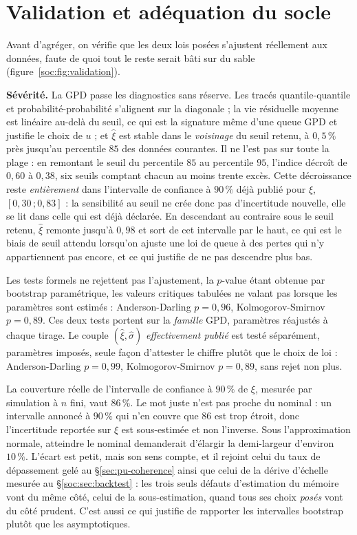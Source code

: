 \section{Validation et adéquation du socle}

Avant d'agréger, on vérifie que les deux lois posées s'ajustent réellement aux données, faute
de quoi tout le reste serait bâti sur du sable (figure~\ref{soc:fig:validation}).

\textbf{Sévérité.} La GPD passe les diagnostics sans réserve. Les tracés quantile-quantile et
probabilité-probabilité s'alignent sur la diagonale ; la vie résiduelle moyenne est linéaire
au-delà du seuil, ce qui est la signature même d'une queue GPD et justifie le choix de $u$ ;
et $\hat\xi$ est stable dans le \emph{voisinage} du seuil retenu, à $0{,}5\,\%$ près jusqu'au
percentile $85$ des données courantes. Il ne l'est pas sur toute la plage :
en remontant le seuil du percentile $85$ au percentile $95$, l'indice décroît de $0{,}60$ à
$0{,}38$, six seuils comptant chacun au moins trente excès. Cette décroissance reste
\emph{entièrement} dans l'intervalle de confiance à $90\,\%$ déjà publié pour $\xi$,
$[0{,}30\,;0{,}83]$ : la sensibilité au seuil ne crée donc pas d'incertitude nouvelle, elle se
lit dans celle qui est déjà déclarée. En descendant au contraire sous le seuil retenu, $\hat\xi$
remonte jusqu'à $0{,}98$ et sort de cet intervalle par le haut, ce qui est le biais de seuil
attendu lorsqu'on ajuste une loi de queue à des pertes qui n'y appartiennent pas encore, et ce
qui justifie de ne pas descendre plus bas.

Les tests formels ne rejettent pas l'ajustement, la $p$-value étant obtenue par bootstrap
paramétrique, les valeurs critiques tabulées ne valant pas lorsque les paramètres sont estimés :
Anderson-Darling $p=0{,}96$, Kolmogorov-Smirnov $p=0{,}89$. Ces deux tests portent sur la
\emph{famille} GPD, paramètres réajustés à chaque tirage. Le couple
$(\hat\xi,\hat\sigma)$ \emph{effectivement publié} est testé séparément, paramètres imposés,
seule façon d'attester le chiffre plutôt que le choix de loi : Anderson-Darling $p=0{,}99$,
Kolmogorov-Smirnov $p=0{,}89$, sans rejet non plus.

La couverture réelle
de l'intervalle de confiance à $90\,\%$ de $\xi$, mesurée par simulation à $n$ fini, vaut
$86\,\%$. Le mot juste n'est pas \og{}proche du nominal\fg{} : un intervalle annoncé à
$90\,\%$ qui n'en couvre que $86$ est trop étroit, donc l'incertitude reportée sur
$\xi$ est sous-estimée et non l'inverse. Sous l'approximation normale, atteindre le nominal
demanderait d'élargir la demi-largeur d'environ $10\,\%$. L'écart est petit, mais son sens
compte, et il rejoint celui du taux de dépassement gelé au \S\ref{sec:pu-coherence} ainsi que
celui de la dérive d'échelle mesurée au \S\ref{soc:sec:backtest} : les trois seuls défauts
d'estimation du mémoire vont du même côté, celui de la sous-estimation, quand tous ses choix
\emph{posés} vont du côté prudent. C'est aussi ce qui justifie de rapporter les
intervalles bootstrap plutôt que les asymptotiques.


